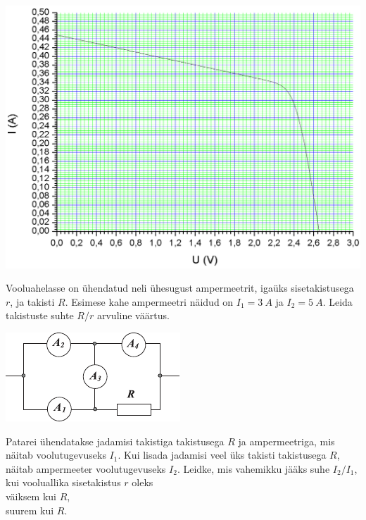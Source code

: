 \documentclass[10pt, twoside]{article}
\begin{document}
{\begin{center}
	\includegraphics[width=0.9\linewidth]{2010-v3g-03-paneel_yl.png}
\end{center}
\probend
\bigskip


Vooluahelasse on ühendatud neli ühesugust ampermeetrit, igaüks sisetakistusega $r$, ja takisti $R$. Esimese kahe ampermeetri näidud on $I_1= \SI{3}{A}$ ja $I_2= \SI{5}{A}$. Leida takistuste suhte $R/r$ arvuline väärtus.

\begin{center}
	\includegraphics[width=0.6\linewidth]{2008-lahg-04-yl}
\end{center}
\probend
\bigskip


Patarei ühendatakse jadamisi takistiga takistusega $R$ ja ampermeetriga, mis näitab voolutugevuseks $I_1$. Kui lisada jadamisi veel üks takisti takistusega $R$, näitab ampermeeter voolutugevuseks $I_2$. Leidke, mis vahemikku jääks suhe $I_2/I_1$, kui vooluallika sisetakistus $r$ oleks\\
\osa väiksem kui $R$,\\
\osa suurem kui $R$.
\probend
\bigskip

}
\end{document}
